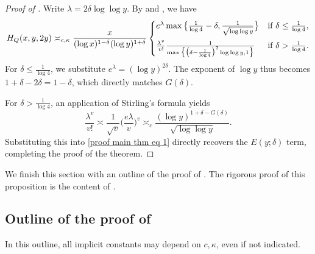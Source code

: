 \documentclass{amsart}
\theoremstyle{definition}
\numberwithin{equation}{section}
\newcommand{\density}{\delta}
\begin{document}
	\begin{proof}[Proof of ]
		Write $\lambda = 2\density \log \log y$. By  and , we have
		\begin{equation} \label{proof main thm eq 1}
			H_Q(x,y,2y) \asymp_{c,\kappa} \frac{x}{(\log x)^{1-\density}(\log y)^{1+\density}} \begin{cases}
				e^\lambda \max\big\{\frac{1}{\log 4} - \density, \frac{1}{\sqrt{\log \log y}}\big\} & \text{if } \density \leq \frac{1}{\log 4}, \\
				\noalign{\vskip 5pt}
				\frac{\lambda^v}{v!} \frac{1}{\max\big\{\big(\density - \frac{1}{\log 4}\big)^2 \log \log y, 1\big\}} & \text{if } \density > \frac{1}{\log 4}.
			\end{cases}
		\end{equation}
		For $\density \leq \frac{1}{\log 4}$, we substitute $e^\lambda = (\log y)^{2\density}$. The exponent of $\log y$ thus becomes $1+\density-2\density = 1-\density$, which directly matches $G(\density)$. 
		
		For $\density > \frac{1}{\log 4}$, an application of Stirling's formula yields
		$$ \frac{\lambda^v}{v!} \asymp \frac{1}{\sqrt{v}} \bigg(\frac{e\lambda}{v}\bigg)^v \asymp_c \frac{(\log y)^{1+\density - G(\density)}}{\sqrt{\log \log y}}.$$
		Substituting this into \eqref{proof main thm eq 1} directly recovers the $E(y;\density)$ term, completing the proof of the theorem.
	\end{proof}
	We finish this section with an outline of the proof of . The rigorous proof of this proposition is the content of .
	\subsection*{Outline of the proof of }
	In this outline, all implicit constants may depend on $c,\kappa$, even if not indicated.
\end{document}
